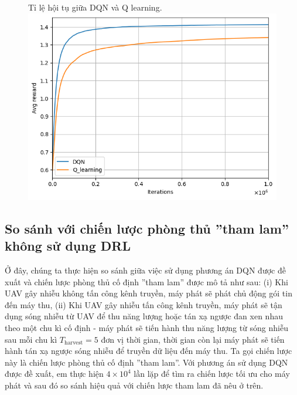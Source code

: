 \documentclass{uetgraduation}
\begin{document}
\begin{figure}{Tỉ lệ hội tụ giữa DQN và Q learning.}
    \centering
    \includegraphics[scale=0.8]{converged}
    \label{fig:converged}
\end{figure}

\subsection{So sánh với chiến lược phòng thủ ''tham lam'' không sử dụng DRL}
Ở đây, chúng ta thực hiện so sánh giữa việc sử dụng phương án DQN được đề xuất và chiến lược phòng thủ cố định ''tham lam'' được mô tả như sau: (i) Khi
UAV gây nhiễu không tấn công kênh truyền, máy phát sẽ phát chủ động gói tin đến máy thu, (ii) Khi UAV gây nhiễu tấn công kênh truyền, máy phát sẽ tận dụng
sóng nhiễu từ UAV để thu năng lượng hoặc tán xạ ngược đan xen nhau theo một chu kì cố định - máy phát sẽ tiến hành thu năng lượng từ sóng nhiễu sau mỗi chu kì
$T_\text{harvest} = 5$ đơn vị thời gian, thời gian còn lại máy phát sẽ tiến hành tán xạ ngược sóng nhiễu để truyền dữ liệu đến máy thu. Ta gọi chiến lược này
là chiến lược phòng thủ cố định ''tham lam''. Với phương án sử dụng DQN được đề xuất, em thực hiện $4 \times 10^4$ lần lặp để tìm ra chiến lược tối ưu cho máy
phát và sau đó so sánh hiệu quả với chiến lược tham lam đã nêu ở trên.
\end{document}
